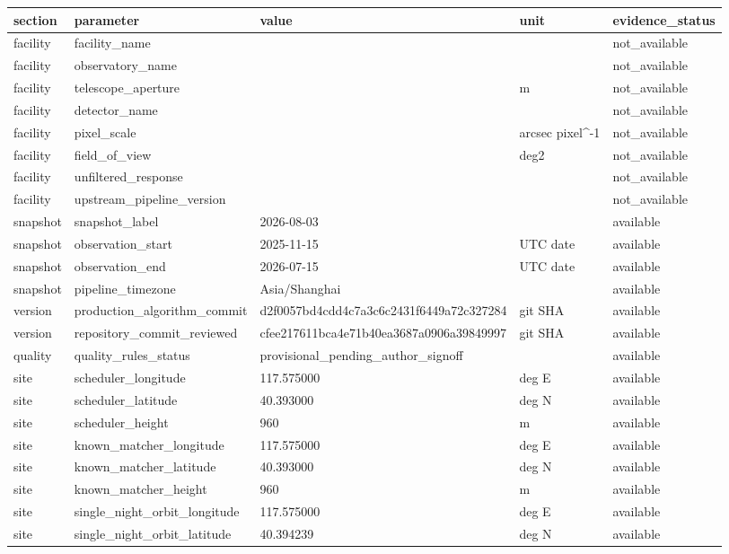\begin{tabular}{lllll}
\toprule
section & parameter & value & unit & evidence\_status \\
\midrule
facility & facility\_name &  &  & not\_available \\
facility & observatory\_name &  &  & not\_available \\
facility & telescope\_aperture &  & m & not\_available \\
facility & detector\_name &  &  & not\_available \\
facility & pixel\_scale &  & arcsec pixel\textasciicircum -1 & not\_available \\
facility & field\_of\_view &  & deg2 & not\_available \\
facility & unfiltered\_response &  &  & not\_available \\
facility & upstream\_pipeline\_version &  &  & not\_available \\
snapshot & snapshot\_label & 2026-08-03 &  & available \\
snapshot & observation\_start & 2025-11-15 & UTC date & available \\
snapshot & observation\_end & 2026-07-15 & UTC date & available \\
snapshot & pipeline\_timezone & Asia/Shanghai &  & available \\
version & production\_algorithm\_commit & d2f0057bd4cdd4c7a3c6c2431f6449a72c327284 & git SHA & available \\
version & repository\_commit\_reviewed & cfee217611bca4e71b40ea3687a0906a39849997 & git SHA & available \\
quality & quality\_rules\_status & provisional\_pending\_author\_signoff &  & available \\
site & scheduler\_longitude & 117.575000 & deg E & available \\
site & scheduler\_latitude & 40.393000 & deg N & available \\
site & scheduler\_height & 960 & m & available \\
site & known\_matcher\_longitude & 117.575000 & deg E & available \\
site & known\_matcher\_latitude & 40.393000 & deg N & available \\
site & known\_matcher\_height & 960 & m & available \\
site & single\_night\_orbit\_longitude & 117.575000 & deg E & available \\
site & single\_night\_orbit\_latitude & 40.394239 & deg N & available \\

\end{tabular}
